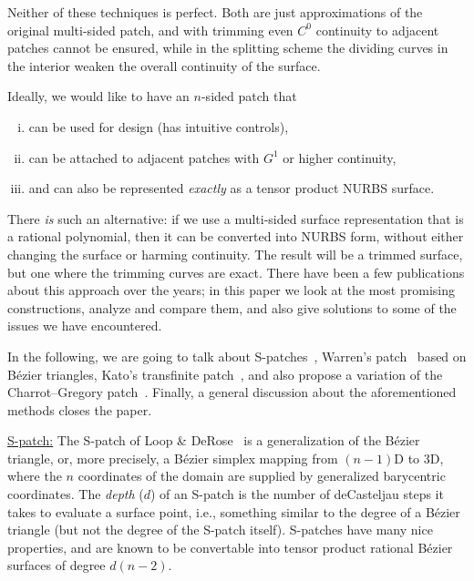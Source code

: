 \documentclass{article}
\begin{document}
Neither of these techniques is perfect. Both are just approximations of the original multi-sided
patch, and with trimming even $C^0$ continuity to adjacent patches cannot be ensured, while in the
splitting scheme the dividing curves in the interior weaken the overall continuity of the surface.

Ideally, we would like to have an $n$-sided patch that
\begin{enumerate}[i)]
\item can be used for design (has intuitive controls),
\item can be attached to adjacent patches with $G^1$ or higher continuity,
\item and can also be represented \emph{exactly} as a tensor product NURBS surface.
\end{enumerate}

There \emph{is} such an alternative:
if we use a multi-sided surface representation that is a rational polynomial,
then it can be converted into NURBS form, without either changing the surface or harming continuity.
The result will be a trimmed surface, but one where the trimming curves are exact.
There have been a few publications about this approach over the years;
in this paper we look at the most promising constructions, analyze and compare them,
and also give solutions to some of the issues we have encountered.

In the following, we are going to talk about
S-patches~\cite{spatch1},
Warren's patch~\cite{warren} based on B\'ezier triangles,
Kato's transfinite patch~\cite{kato},
and also propose a variation of the Charrot--Gregory patch~\cite{charrot}.
Finally, a general discussion about the aforementioned methods closes the paper.

\vspace{10pt}
\noindent\underline{S-patch:}\vspace{0.2em}\newline
The S-patch of Loop \& DeRose~\cite{spatch1} is a generalization of the B\'ezier triangle, or,
more precisely, a B\'ezier simplex mapping from $(n-1)$D to 3D, where the $n$ coordinates of the
domain are supplied by generalized barycentric coordinates. The \emph{depth} ($d$) of an S-patch
is the number of deCasteljau steps it takes to evaluate a surface point, i.e., something similar
to the degree of a B\'ezier triangle (but not the degree of the S-patch itself).
S-patches have many nice properties, and are known to be convertable into tensor product
rational B\'ezier surfaces of degree $d(n-2)$.
\end{document}

